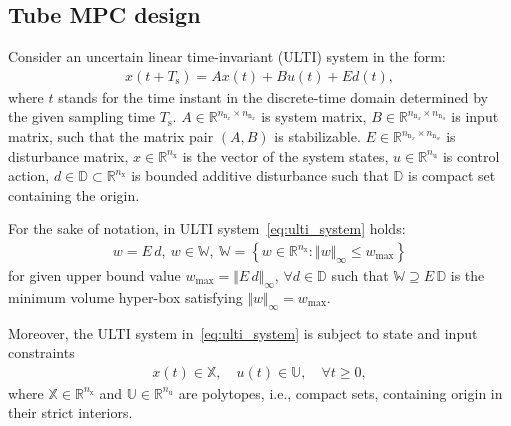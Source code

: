 \documentclass[letterpaper, 10 pt, conference]{ieeeconf}
\begin{document}
\subsection{Tube MPC design}
\label{sec:tube_mpc}

Consider an uncertain linear time-invariant (ULTI) system in the form:
\begin{eqnarray}
	\label{eq:ulti_system}
	x(t+T_{\mathrm{s}}) = A x(t) + B u(t) + E d(t), %
\end{eqnarray}
where $t$ stands for the time instant in the discrete-time domain determined by the given sampling time $T_{\mathrm{s}}$. $A \in \mathbb{R}^{n_{\mathrm{n}_{x}} \times n_{\mathrm{n}_{x}}}$ is system matrix, $B \in \mathbb{R}^{n_{\mathrm{n}_{x}} \times n_{\mathrm{n}_{u}}}$ is input matrix, such that the matrix pair $(A,B)$ is stabilizable. $E \in \mathbb{R}^{n_{\mathrm{n}_{x}} \times n_{\mathrm{n}_{w}}}$ is disturbance matrix, $x \in \mathbb{R}^{n_{\mathrm{x}}}$ is the vector of the system states, $u \in \mathbb{R}^{n_{\mathrm{u}}}$ is control action, $d \in \mathbb{D} \subset \mathbb{R}^{n_{\mathrm{x}}}$ is bounded additive disturbance such that $\mathbb{D}$ is compact set containing the origin. 

For the sake of notation, in ULTI system~\eqref{eq:ulti_system} holds:
\begin{eqnarray}
	\label{eq:disturbance_set}
	w = E \, d, ~ w \in \mathbb{W}, ~ \mathbb{W} = \left\{ w \in \mathbb{R}^{n_{\mathrm{x}}} : \Vert w \Vert_{\infty} \leq w_{\max} \right\}
\end{eqnarray}
for given upper bound value $w_{\max} = \Vert E \, d \Vert_{\infty}$, $\forall d \in \mathbb{D}$ such that $\mathbb{W} \supseteq E \, \mathbb{D}$ is the minimum volume hyper-box satisfying $\Vert w \Vert_{\infty} = w_{\max}$.

Moreover, the ULTI system in~\eqref{eq:ulti_system} is subject to state and input constraints
\begin{eqnarray}
	\label{eq:constraints_x_u}
	x(t) \in \mathbb{X}, \quad u(t) \in \mathbb{U}, \quad \forall t \geq 0,
\end{eqnarray}
where $\mathbb{X} \in \mathbb{R}^{n_{\mathrm{x}}}$ and $\mathbb{U} \in \mathbb{R}^{n_{\mathrm{u}}}$ are polytopes, i.e., compact sets, containing origin in their strict interiors. 
\end{document}

